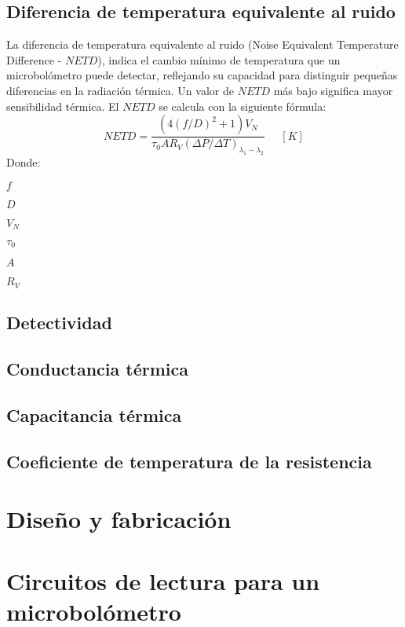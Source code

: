         \subsection{Diferencia de temperatura equivalente al ruido}
        La diferencia de temperatura equivalente al ruido (Noise Equivalent Temperature Difference - $NETD$), indica el cambio mínimo de temperatura que un microbolómetro puede detectar, reflejando su capacidad para distinguir pequeñas diferencias en la radiación térmica. Un valor de $NETD$ más bajo significa mayor sensibilidad térmica.
        El $NETD$ se calcula con la siguiente fórmula:
        \begin{equation}
        NETD = \frac{(4(f/D)^{2} + 1)V_{N}}{\tau_{0}AR_{V}(\Delta P/\Delta T)_{\lambda_{1} - \lambda_{2}}}\phantom{abc} [K]
        \label{eq:NETD}
        \end{equation}        
        Donde:
        
        $f$
        
        $D$
        
        $V_{N}$
        
        $\tau_{0}$
        
        $A$
        
        $R_{V}$
        
        \subsection{Detectividad}
        \subsection{Conductancia térmica}
        \subsection{Capacitancia térmica}
        \subsection{Coeficiente de temperatura de la resistencia}


\section{Diseño y fabricación}

\section{Circuitos de lectura para un microbolómetro}